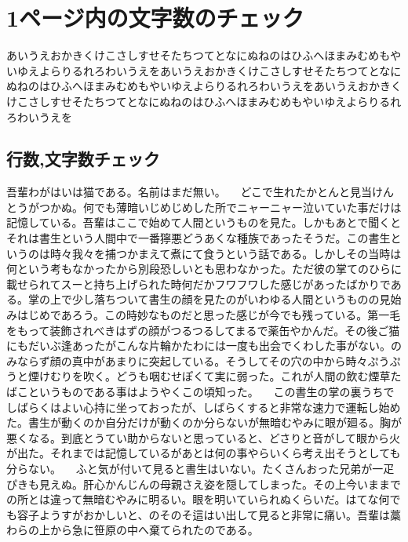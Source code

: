 \documentclass[main.tex]{subfiles}
\begin{document}
\setcounter{chapter}{1}     %


\chapter{1ページ内の文字数のチェック}
\thispagestyle{fancy}
あいうえおかきくけこさしすせそたちつてとなにぬねのはひふへほまみむめもやいゆえよらりるれろわいうえをあいうえおかきくけこさしすせそたちつてとなにぬねのはひふへほまみむめもやいゆえよらりるれろわいうえをあいうえおかきくけこさしすせそたちつてとなにぬねのはひふへほまみむめもやいゆえよらりるれろわいうえを


\section{行数,文字数チェック}
\clearpage
吾輩わがはいは猫である。名前はまだ無い。
　どこで生れたかとんと見当けんとうがつかぬ。何でも薄暗いじめじめした所でニャーニャー泣いていた事だけは記憶している。吾輩はここで始めて人間というものを見た。しかもあとで聞くとそれは書生という人間中で一番獰悪どうあくな種族であったそうだ。この書生というのは時々我々を捕つかまえて煮にて食うという話である。しかしその当時は何という考もなかったから別段恐しいとも思わなかった。ただ彼の掌てのひらに載せられてスーと持ち上げられた時何だかフワフワした感じがあったばかりである。掌の上で少し落ちついて書生の顔を見たのがいわゆる人間というものの見始みはじめであろう。この時妙なものだと思った感じが今でも残っている。第一毛をもって装飾されべきはずの顔がつるつるしてまるで薬缶やかんだ。その後ご猫にもだいぶ逢あったがこんな片輪かたわには一度も出会でくわした事がない。のみならず顔の真中があまりに突起している。そうしてその穴の中から時々ぷうぷうと煙けむりを吹く。どうも咽むせぽくて実に弱った。これが人間の飲む煙草たばこというものである事はようやくこの頃知った。
　この書生の掌の裏うちでしばらくはよい心持に坐っておったが、しばらくすると非常な速力で運転し始めた。書生が動くのか自分だけが動くのか分らないが無暗むやみに眼が廻る。胸が悪くなる。到底とうてい助からないと思っていると、どさりと音がして眼から火が出た。それまでは記憶しているがあとは何の事やらいくら考え出そうとしても分らない。
　ふと気が付いて見ると書生はいない。たくさんおった兄弟が一疋ぴきも見えぬ。肝心かんじんの母親さえ姿を隠してしまった。その上今いままでの所とは違って無暗むやみに明るい。眼を明いていられぬくらいだ。はてな何でも容子ようすがおかしいと、のそのそ這はい出して見ると非常に痛い。吾輩は藁わらの上から急に笹原の中へ棄てられたのである。
\end{document}
